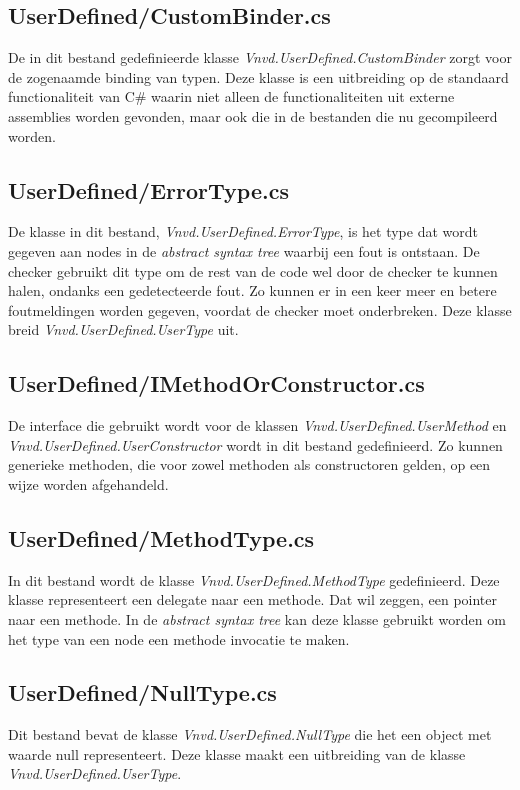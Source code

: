 \subsection{UserDefined/CustomBinder.cs}
De in dit bestand gedefinieerde klasse \textit{Vnvd.UserDefined.CustomBinder} zorgt voor de zogenaamde binding van typen. Deze klasse is een uitbreiding op de standaard functionaliteit van C\# waarin niet alleen de functionaliteiten uit externe assemblies worden gevonden, maar ook die in de bestanden die nu gecompileerd worden.

\subsection{UserDefined/ErrorType.cs}
De klasse in dit bestand, \textit{Vnvd.UserDefined.ErrorType}, is het type dat wordt gegeven aan nodes in de \textit{abstract syntax tree} waarbij een fout is ontstaan. De checker gebruikt dit type om de rest van de code wel door de checker te kunnen halen, ondanks een gedetecteerde fout. Zo kunnen er in een keer meer en betere foutmeldingen worden gegeven, voordat de checker moet onderbreken. Deze klasse breid \textit{Vnvd.UserDefined.UserType} uit.

\subsection{UserDefined/IMethodOrConstructor.cs}
De interface die gebruikt wordt voor de klassen \textit{Vnvd.UserDefined.UserMethod} en \textit{Vnvd.UserDefined.UserConstructor} wordt in dit bestand gedefinieerd. Zo kunnen generieke methoden, die voor zowel methoden als constructoren gelden, op een wijze worden afgehandeld.

\subsection{UserDefined/MethodType.cs}
In dit bestand wordt de klasse \textit{Vnvd.UserDefined.MethodType} gedefinieerd. Deze klasse representeert een delegate naar een methode. Dat wil zeggen, een pointer naar een methode. In de \textit{abstract syntax tree} kan deze klasse gebruikt worden om het type van een node een methode invocatie te maken.

\subsection{UserDefined/NullType.cs}
Dit bestand bevat de klasse \textit{Vnvd.UserDefined.NullType} die het een object met waarde null representeert. Deze klasse maakt een uitbreiding van de klasse \textit{Vnvd.UserDefined.UserType}.


